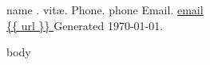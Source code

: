 \documentclass[letter]{article}
\begin{document}
{\huge {{ name }}. vit\ae.} \hfill
{Phone.} {\small {{ phone }}} \hspace{2mm}
{Email.} {\small \href{mailto: {{ email }} }{ {{email }} }} \\
\url{ {{ url }} } \hfill Generated \today.
\vspace{3mm}

{{ body }}
\end{document}
